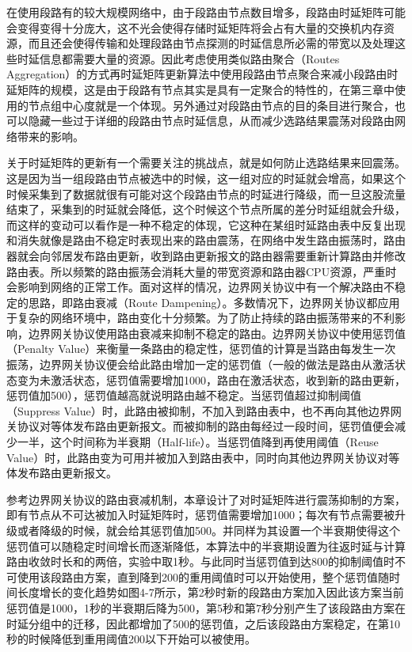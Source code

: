 在使用段路有的较大规模网络中，由于段路由节点数目增多，段路由时延矩阵可能会变得变得十分庞大，这不光会使得存储时延矩阵将会占有大量的交换机内存资源，而且还会使得传输和处理段路由节点探测的时延信息所必需的带宽以及处理这些时延信息都需要大量的资源。因此考虑使用类似路由聚合（Routes Aggregation）的方式再时延矩阵更新算法中使用段路由节点聚合来减小段路由时延矩阵的规模，这是由于段路有节点其实是具有一定聚合的特性的，在第三章中使用的节点组中心度就是一个体现。另外通过对段路由节点的目的条目进行聚合，也可以隐藏一些过于详细的段路由节点时延信息，从而减少选路结果震荡对段路由网络带来的影响。

关于时延矩阵的更新有一个需要关注的挑战点，就是如何防止选路结果来回震荡。这是因为当一组段路由节点被选中的时候，这一组对应的时延就会增高，如果这个时候采集到了数据就很有可能对这个段路由节点的时延进行降级，而一旦这股流量结束了，采集到的时延就会降低，这个时候这个节点所属的差分时延组就会升级，而这样的变动可以看作是一种不稳定的体现，它这种在某组时延路由表中反复出现和消失就像是路由不稳定时表现出来的路由震荡，在网络中发生路由振荡时，路由器就会向邻居发布路由更新，收到路由更新报文的路由器需要重新计算路由并修改路由表。所以频繁的路由振荡会消耗大量的带宽资源和路由器CPU资源，严重时会影响到网络的正常工作。面对这样的情况，边界网关协议中有一个解决路由不稳定的思路，即路由衰减（Route Dampening）。多数情况下，边界网关协议都应用于复杂的网络环境中，路由变化十分频繁。为了防止持续的路由振荡带来的不利影响，边界网关协议使用路由衰减来抑制不稳定的路由。边界网关协议中使用惩罚值（Penalty Value）来衡量一条路由的稳定性，惩罚值的计算是当路由每发生一次振荡，边界网关协议便会给此路由增加一定的惩罚值（一般的做法是路由从激活状态变为未激活状态，惩罚值需要增加1000，路由在激活状态，收到新的路由更新，惩罚值加500），惩罚值越高就说明路由越不稳定。当惩罚值超过抑制阈值（Suppress Value）时，此路由被抑制，不加入到路由表中，也不再向其他边界网关协议对等体发布路由更新报文。而被抑制的路由每经过一段时间，惩罚值便会减少一半，这个时间称为半衰期（Half-life）。当惩罚值降到再使用阈值（Reuse Value）时，此路由变为可用并被加入到路由表中，同时向其他边界网关协议对等体发布路由更新报文。

参考边界网关协议的路由衰减机制，本章设计了对时延矩阵进行震荡抑制的方案，即有节点从不可达被加入时延矩阵时，惩罚值需要增加1000；每次有节点需要被升级或者降级的时候，就会给其惩罚值加500。并同样为其设置一个半衰期使得这个惩罚值可以随稳定时间增长而逐渐降低，本算法中的半衰期设置为往返时延与计算路由收敛时长和的两倍，实验中取1秒。与此同时当惩罚值到达800的抑制阈值时不可使用该段路由方案，直到降到200的重用阈值时可以开始使用，整个惩罚值随时间长度增长的变化趋势如图4-7所示，第2秒时新的段路由方案加入因此该方案当前惩罚值是1000，1秒的半衰期后降为500，第5秒和第7秒分别产生了该段路由方案在时延分组中的迁移，因此都增加了500的惩罚值，之后该段路由方案稳定，在第10秒的时候降低到重用阈值200以下开始可以被使用。

